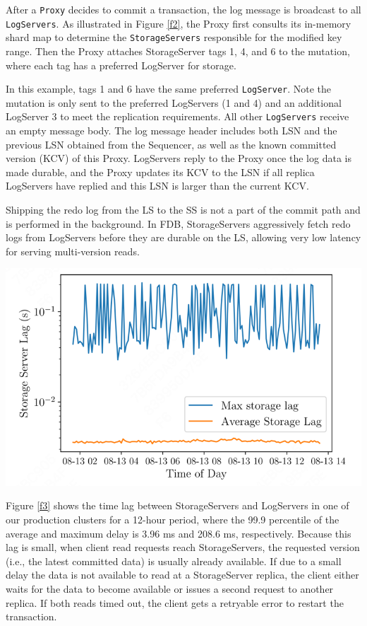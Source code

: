 \documentclass[11pt]{article}
\begin{document}
After a \texttt{Proxy} decides to commit a transaction, the log message is broadcast to all \texttt{LogServers}. As
illustrated in Figure \ref{f2}, the Proxy first consults its in-memory shard map to determine the
\texttt{StorageServers} responsible for the modified key range. Then the Proxy attaches StorageServer tags 1,
4, and 6 to the mutation, where each tag has a preferred LogServer for storage.

In this example, tags 1 and 6 have the same preferred \texttt{LogServer}. Note the mutation is only sent to the
preferred LogServers (1 and 4) and an additional LogServer 3 to meet the replication requirements. All
other \texttt{LogServers} receive an empty message body. The log message header includes both LSN and the
previous LSN obtained from the Sequencer, as well as the known committed version (KCV) of this Proxy.
LogServers reply to the Proxy once the log data is made durable, and the Proxy updates its KCV to the
LSN if all replica LogServers have replied and this LSN is larger than the current KCV.

Shipping the redo log from the LS to the SS is not a part of the commit path and is performed in the
background. In FDB, StorageServers aggressively fetch redo logs from LogServers before they are
durable on the LS, allowing very low latency for serving multi-version reads.

\begin{center}
\includegraphics[width=.5\textwidth]{../../images/papers/111.png}
\end{center}

Figure \ref{f3} shows the time lag between StorageServers and LogServers in one of our production
clusters for a 12-hour period, where the 99.9 percentile of the average and maximum delay is 3.96 ms
and 208.6 ms, respectively. Because this lag is small, when client read requests reach StorageServers,
the requested version (i.e., the latest committed data) is usually already available. If due to a
small delay the data is not available to read at a StorageServer replica, the client either waits for
the data to become available or issues a second request to another replica. If both reads timed out,
the client gets a retryable error to restart the transaction.
\end{document}
